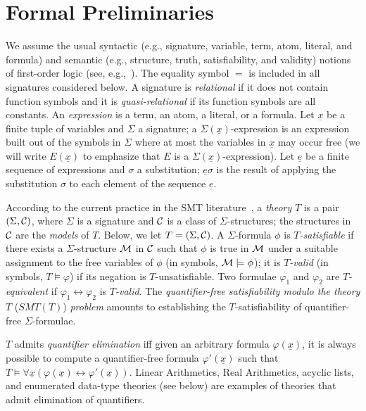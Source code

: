 \documentclass{LMCS}
\newcommand{\ux}{\ensuremath{\underline x}}
\newcommand{\cM}{\ensuremath \mathcal M}
\newcommand{\Cc}{\ensuremath \mathcal C}
\theoremstyle{plain}\newtheorem{assumption}[thm]{Assumption}
\theoremstyle{plain}\newtheorem{proposition}[thm]{Proposition}
\theoremstyle{plain}\newtheorem{property}[thm]{Property}
\theoremstyle{plain}\newtheorem{example}[thm]{Example}
\theoremstyle{plain}\newtheorem{claim}[thm]{Claim}
\theoremstyle{plain}\newtheorem{lemma}[thm]{Lemma}
\begin{document}
\section{Formal Preliminaries}
\label{sec:prelim}

We assume the usual syntactic (e.g., signature, variable, term, atom,
literal, and formula) and semantic (e.g., structure, truth, satisfiability, and validity) notions of first-order logic
(see, e.g.,~\cite{enderton}).  The equality symbol $=$ is included in
all signatures considered below.  A signature is \emph{relational} if
it does not contain function symbols and it is \emph{quasi-relational}
if its function symbols are all constants.  An \emph{expression} is a term, an atom, a literal, or a
formula. Let $\ux$ be a finite tuple of variables and $\Sigma$ a
signature; a $\Sigma(\ux)$-expression is an expression built out of
the symbols in $\Sigma$ where at most the variables in $\ux$ may occur
free (we will write $E(\ux)$ to emphasize that $E$ is a
$\Sigma(\ux)$-expression).  Let $\underline{e}$ be a finite sequence
of expressions and $\sigma$ a substitution; $\underline{e}\sigma$ is
the result of applying the substitution $\sigma$ to each element of
the sequence $\underline{e}$.


According to the current practice in the SMT
literature~\cite{smt-lib}, a \emph{theory} $T$ is a pair $({\Sigma},
\Cc)$, where $\Sigma$ is a signature and $\Cc$ is a class of
$\Sigma$-structures; the structures in $\Cc$ are the \emph{models} of
$T$.  Below, we let $T=({\Sigma}, \Cc)$.
A $\Sigma$-formula $\phi$ is \emph{$T$-satisfiable} if there exists a
$\Sigma$-structure $\cM$ in $\Cc$ such that $\phi$ is true in $\cM$
under a suitable assignment to the free variables of $\phi$ (in
symbols, $\cM \models \phi$); it is \emph{$T$-valid} (in symbols,
$T\models \varphi$) if its negation is $T$-unsatisfiable.  Two
formulae $\varphi_1$ and $\varphi_2$ are \emph{$T$-equivalent} if
$\varphi_1 \leftrightarrow \varphi_2$ is \emph{$T$-valid}.  The
\emph{quantifier-free satisfiability modulo the theory $T$} ($SMT(T)$)
\emph{problem} amounts to establishing the $T$-satisfiability of
quantifier-free $\Sigma$-formulae.

$T$ admits \emph{quantifier elimination} iff
given an arbitrary formula $\varphi(\ux)$, it is always possible to
compute a quantifier-free formula $\varphi'(\ux)$ such that $T\models
\forall \ux (\varphi(\ux)\leftrightarrow \varphi'(\ux))$.  Linear
Arithmetics, Real Arithmetics, acyclic lists, and enumerated data-type
theories (see below) are examples of theories that admit elimination
of quantifiers.
\end{document}
